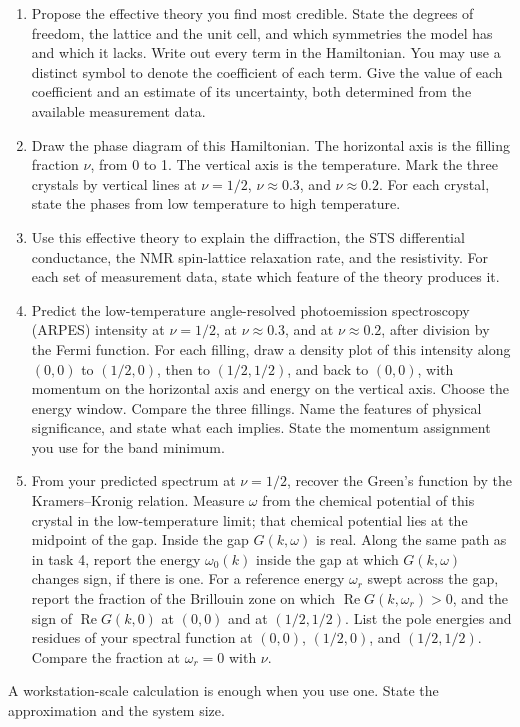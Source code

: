 \documentclass[12pt]{article}
\begin{document}
\begin{enumerate}
\item Propose the effective theory you find most credible. State the degrees of freedom, the lattice and the unit cell, and which symmetries the model has and which it lacks. Write out every term in the Hamiltonian. You may use a distinct symbol to denote the coefficient of each term. Give the value of each coefficient and an estimate of its uncertainty, both determined from the available measurement data.

\item Draw the phase diagram of this Hamiltonian. The horizontal axis is the filling fraction \(\nu\), from 0 to 1. The vertical axis is the temperature. Mark the three crystals by vertical lines at \(\nu=1/2\), \(\nu\approx 0.3\), and \(\nu\approx 0.2\). For each crystal, state the phases from low temperature to high temperature.

\item Use this effective theory to explain the diffraction, the STS differential conductance, the NMR spin-lattice relaxation rate, and the resistivity. For each set of measurement data, state which feature of the theory produces it.

\item Predict the low-temperature angle-resolved photoemission spectroscopy (ARPES) intensity at \(\nu=1/2\), at \(\nu\approx 0.3\), and at \(\nu\approx 0.2\), after division by the Fermi function. For each filling, draw a density plot of this intensity along \((0,0)\) to \((1/2,0)\), then to \((1/2,1/2)\), and back to \((0,0)\), with momentum on the horizontal axis and energy on the vertical axis. Choose the energy window. Compare the three fillings. Name the features of physical significance, and state what each implies. State the momentum assignment you use for the band minimum.

\item From your predicted spectrum at \(\nu=1/2\), recover the Green's function by the Kramers–Kronig relation. Measure \(\omega\) from the chemical potential of this crystal in the low-temperature limit; that chemical potential lies at the midpoint of the gap. Inside the gap \(G(k,\omega)\) is real. Along the same path as in task 4, report the energy \(\omega_0(k)\) inside the gap at which \(G(k,\omega)\) changes sign, if there is one. For a reference energy \(\omega_r\) swept across the gap, report the fraction of the Brillouin zone on which \(\operatorname{Re} G(k,\omega_r)>0\), and the sign of \(\operatorname{Re} G(k,0)\) at \((0,0)\) and at \((1/2,1/2)\). List the pole energies and residues of your spectral function at \((0,0)\), \((1/2,0)\), and \((1/2,1/2)\). Compare the fraction at \(\omega_r=0\) with \(\nu\).
\end{enumerate}

A workstation-scale calculation is enough when you use one. State the approximation and the system size.
\end{document}

